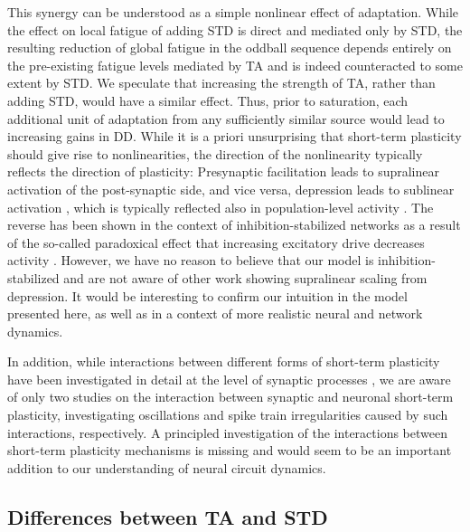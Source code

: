 \documentclass[9pt,lineno,onehalfspacing]{elife}
\begin{document}
This synergy can be understood as a simple nonlinear effect of adaptation. While the effect on local fatigue of adding STD is direct and mediated only by STD, the resulting reduction of global fatigue in the oddball sequence depends entirely on the pre-existing fatigue levels mediated by TA and is indeed counteracted to some extent by STD. We speculate that increasing the strength of TA, rather than adding STD, would have a similar effect. Thus, prior to saturation, each additional unit of adaptation from any sufficiently similar source would lead to increasing gains in DD. While it is a priori unsurprising that short-term plasticity should give rise to nonlinearities, the direction of the nonlinearity typically reflects the direction of plasticity: Presynaptic facilitation leads to supralinear activation of the post-synaptic side, and vice versa, depression leads to sublinear activation \citep{Tsodyks1997-qt, Varela1997-nr}, which is typically reflected also in population-level activity \citep{Tsodyks1998-bq}. The reverse has been shown in the context of inhibition-stabilized networks \citep{Wu2022-qx} as a result of the so-called paradoxical effect that increasing excitatory drive decreases activity \citep{Tsodyks1997-hr, Sanzeni2020-su}. However, we have no reason to believe that our model is inhibition-stabilized and are not aware of other work showing supralinear scaling from depression. It would be interesting to confirm our intuition in the model presented here, as well as in a context of more realistic neural and network dynamics.

In addition, while interactions between different forms of short-term plasticity have been investigated in detail at the level of synaptic processes \citep{Tsodyks1997-qt, Varela1997-nr, Buonomano1998-hf, Hennig2008-sc, Anwar2017-qg, Mondal2022-av}, we are aware of only two studies on the interaction between synaptic and neuronal short-term plasticity, investigating oscillations \citep{Mejias2011-rv} and spike train irregularities \citep{Ileri2015-eu} caused by such interactions, respectively. A principled investigation of the interactions between short-term plasticity mechanisms is missing and would seem to be an important addition to our understanding of neural circuit dynamics.

\subsection{Differences between TA and STD}
\end{document}
